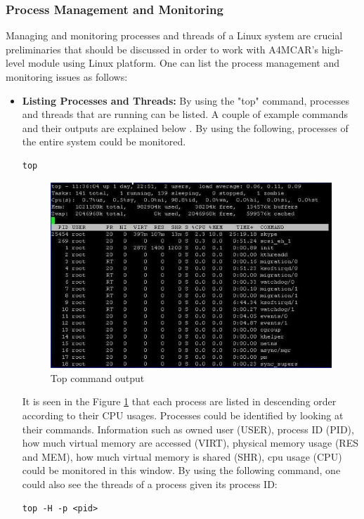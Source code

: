 \subsubsection{Process Management and Monitoring}
Managing and monitoring processes and threads of a Linux system are crucial preliminaries that should be discussed in order to work with A4MCAR's high-level module using Linux platform. One can list the process management and monitoring issues as follows:
\begin{itemize}
	\item \textbf{Listing Processes and Threads:}
	By using the "top" command, processes and threads that are running can be listed. A couple of example commands and their outputs are explained below \cite{topexamples}. By using the following, processes of the entire system could be monitored.
	\begin{lstlisting}[style=bash]
		top
	\end{lstlisting}
	\begin{figure}[!ht]
		\centering
		\captionsetup{justification=centering}
		\includegraphics[width=\textwidth]{content/images/topexample1.png}
		\caption{Top command output}
		\label{fig:topexample1}
	\end{figure}
	It is seen in the Figure \ref{fig:topexample1} that each process are listed in descending order according to their CPU usages. Processes could be identified by looking at their commands. Information such as owned user (USER), process ID (PID), how much virtual memory are accessed (VIRT), physical memory usage (RES and MEM), how much virtual memory is shared (SHR), cpu usage (CPU) could be monitored in this window. By using the following command, one could also see the threads of a process given its process ID:
	\begin{lstlisting}[style=bash]
	top -H -p <pid>
	\end{lstlisting}
	

\end{itemize}
